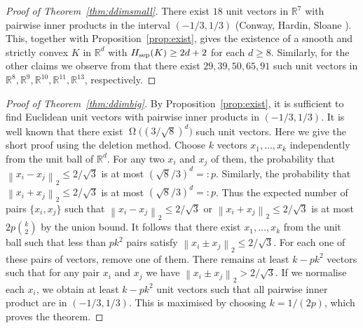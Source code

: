 \documentclass[a4paper,12pt]{article}
\theoremstyle{plain}
\theoremstyle{definition}
\newcommand{\numbersystem}[1]{\mathbb{#1}}
\newcommand{\bR}{\numbersystem{R}}
\newcommand{\norm}[2][]{\left\lVert#2\right\rVert_{#1}}
\newcommand{\Hsep}{H_{\textnormal{sep}}}
\begin{document}
\begin{proof}[Proof of Theorem~\ref{thm:ddimsmall}]
There exist $18$ unit vectors in $\bR^7$ with pairwise inner products in the interval $(-1/3,1/3)$ (Conway, Hardin, Sloane \cite{CHS96}).
This, together with Proposition~\ref{prop:exist}, gives the existence of a smooth and strictly convex $K$ in $\bR^{d}$ with $\Hsep(K)\geq 2d+2$ for each $d\geq 8$.
Similarly, for the other claims we observe from \cite{CHS96} that there exist $29, 39, 50, 65, 91$ such unit vectors in $\bR^8, \bR^9, \bR^{10}, \bR^{11},\bR^{13}$, respectively.
\end{proof}

\begin{proof}[Proof of Theorem~\ref{thm:ddimbig}]
By Proposition~\ref{prop:exist}, it is sufficient to find Euclidean unit vectors with 
pairwise inner products in $(-1/3,1/3)$.
 It is well known that there exist $\upOmega\bigl((3/\sqrt{8})^d\bigr)$ such unit vectors.
 Here we give the short proof using the deletion method.
 Choose $k$ vectors $x_1,\dots,x_k$ independently from the unit ball of $\bR^d$.
 For any two $x_i$ and $x_j$ of them, the probability that $\norm[2]{x_i-x_j}\leq 2/\sqrt{3}$ is at most $(\sqrt{8}/3)^d =: p$.
 Similarly, the probability that $\norm[2]{x_i+x_j}\leq 2/\sqrt{3}$ is at most $(\sqrt{8}/3)^d =: p$.
Thus the expected number of pairs $\{x_i,x_j\}$ such that $\norm[2]{x_i-x_j}\leq 2/\sqrt{3}$ or $\norm[2]{x_i+x_j}\leq 2/\sqrt{3}$ is at most $2p \binom{k}{2}$ by the union bound.
It follows that there exist $x_1,\dots,x_k$ from the unit ball such that less than $pk^2$ pairs satisfy $\norm[2]{x_i\pm x_j}\leq 2/\sqrt{3}$.
 For each one of these pairs of vectors, remove one of them.
 There remains at least $k - pk^2$ vectors such that for any pair $x_i$ and $x_j$ we have $\norm[2]{x_i\pm x_j} > 2/\sqrt{3}$.
 If we normalise each $x_i$, we obtain at least $k-pk^2$ unit vectors such that all pairwise inner product are in $(-1/3,1/3)$.
 This is maximised by choosing $k = 1/(2p)$, which proves the theorem.
\end{proof}
\end{document}
